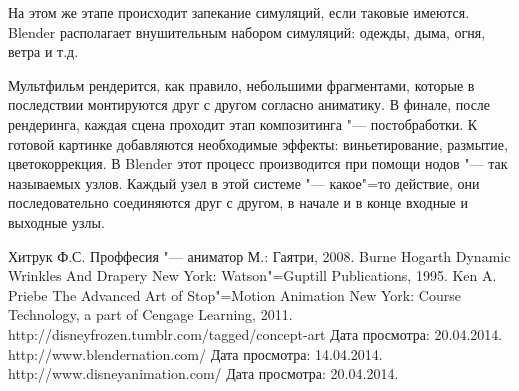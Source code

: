 \documentclass[10pt, a5paper]{article}
\begin{document}
На этом же этапе происходит запекание симуляций, если таковые имеются. Blender располагает внушительным набором симуляций: одежды, дыма, огня, ветра и т.д.

Мультфильм рендерится, как правило, небольшими фрагментами, которые в последствии монтируются друг с другом согласно аниматику. В финале, после рендеринга, каждая сцена проходит этап композитинга "--- постобработки. К готовой картинке добавляются необходимые эффекты: виньетирование, размытие, цветокоррекция. В Blender этот процесс производится при помощи нодов "--- так называемых узлов. Каждый узел в этой системе "--- какое"=то действие, они последовательно соединяются друг с другом, в начале и в конце входные и выходные узлы.


\begin{thebibliography}{9}
 Хитрук Ф.С. Проффесия "--- аниматор М.: Гаятри, 2008.
 Burne Hogarth  Dynamic Wrinkles And Drapery New York: Watson"=Guptill Publications, 1995.
 Ken A. Priebe The Advanced Art of Stop"=Motion Animation New York: Course Technology, a part of Cengage Learning, 2011.
 http://disneyfrozen.tumblr.com/tagged/concept-art  Дата просмотра: 20.04.2014.
 http://www.blendernation.com/ Дата просмотра: 14.04.2014.
 http://www.disneyanimation.com/ Дата просмотра: 20.04.2014.
\end{thebibliography}
\end{document}
